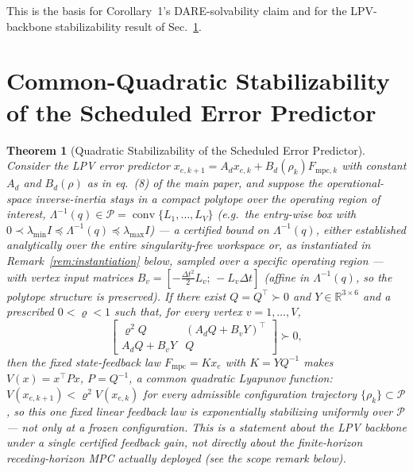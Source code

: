 \documentclass[journal]{IEEEtran}
\newtheorem{theorem}{Theorem}
\newcommand{\Laminv}{\Lambda^{-1}(q)}
\newcommand{\Fmpc}{F_{\text{mpc}}}
\newcommand{\Fmpck}[1]{F_{\text{mpc},#1}}
\begin{document}
This is the basis for Corollary~1's DARE-solvability claim and for the
LPV-backbone stabilizability result of Sec.~\ref{sec:stab}.

\section{Common-Quadratic Stabilizability of the Scheduled Error Predictor}\label{sec:stab}

\begin{theorem}[Quadratic Stabilizability of the Scheduled Error
Predictor]\label{thm:workspace}
Consider the LPV error predictor
$x_{e,k+1}=A_dx_{e,k}+B_d(\rho_k)\Fmpck{k}$ with constant $A_d$ and
$B_d(\rho)$ as in eq.~(8) of the main paper, and suppose the
operational-space inverse-inertia stays in a compact polytope over the
operating region of interest,
$\Laminv\in\mathcal P=\operatorname{conv}\{L_1,\dots,L_V\}$ (e.g.\ the
entry-wise box with $0\prec\lambda_{\min}I\preceq\Laminv\preceq\lambda_{\max}I$)
--- a certified bound on $\Laminv$, either established analytically over
the entire singularity-free workspace or, as instantiated in
Remark~\ref{rem:instantiation} below, sampled over a specific operating
region --- with vertex input matrices
$B_v=[-\tfrac{\Delta t^2}2L_v;\,-L_v\Delta t]$ (affine in $\Laminv$, so
the polytope structure is preserved). If there exist $Q=Q^\top\succ0$ and
$Y\in\mathbb R^{3\times6}$ and a prescribed $0<\varrho<1$ such that, for
every vertex $v=1,\dots,V$,
\begin{equation}
\begin{bmatrix}\varrho^2Q & (A_dQ+B_vY)^\top\\A_dQ+B_vY & Q\end{bmatrix}\succ0,
\label{eq:lmi}
\end{equation}
then the \emph{fixed} state-feedback law $\Fmpc=Kx_e$ with $K=YQ^{-1}$
makes $V(x)=x^\top Px$, $P=Q^{-1}$, a \emph{common} quadratic Lyapunov
function: $V(x_{e,k+1})<\varrho^2V(x_{e,k})$ for
\emph{every} admissible configuration trajectory
$\{\rho_k\}\subset\mathcal P$, so this one fixed linear feedback law is
exponentially stabilizing uniformly over $\mathcal P$ --- not only at a
frozen configuration. This is a statement about the LPV \emph{backbone}
under a single certified feedback gain, not directly about the
finite-horizon receding-horizon MPC actually deployed (see the scope
remark below).
\end{theorem}
\end{document}
